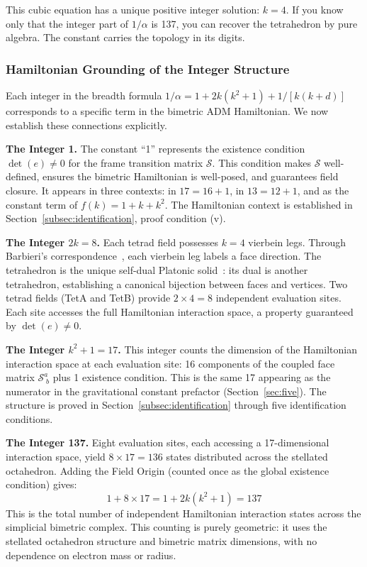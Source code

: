 \documentclass[aps,prd,preprint,superscriptaddress,showpacs,preprintnumbers,amsmath,amssymb,nofootinbib]{revtex4-2}
\begin{document}
This cubic equation has a unique positive integer solution: $k = 4$. If you know only that the integer part of $1/\alpha$ is 137, you can recover the tetrahedron by pure algebra. The constant carries the topology in its digits.

\subsubsection*{Hamiltonian Grounding of the Integer Structure}

Each integer in the breadth formula $1/\alpha = 1 + 2k(k^2 + 1) + 1/[k(k+d)]$ corresponds to a specific term in the bimetric ADM Hamiltonian. We now establish these connections explicitly.

\textbf{The Integer 1.}
The constant ``1'' represents the existence condition $\det(e) \neq 0$ for the frame transition matrix $\mathcal{S}$. This condition makes $\mathcal{S}$ well-defined, ensures the bimetric Hamiltonian is well-posed, and guarantees field closure. It appears in three contexts: in $17 = 16 + 1$, in $13 = 12 + 1$, and as the constant term of $f(k) = 1 + k + k^2$. The Hamiltonian context is established in Section~\ref{subsec:identification}, proof condition (v).

\textbf{The Integer $2k = 8$.}
Each tetrad field possesses $k = 4$ vierbein legs. Through Barbieri's correspondence~\cite{barbieri1998}, each vierbein leg labels a face direction. The tetrahedron is the unique self-dual Platonic solid~\cite{coxeter1973}: its dual is another tetrahedron, establishing a canonical bijection between faces and vertices. Two tetrad fields (TetA and TetB) provide $2 \times 4 = 8$ independent evaluation sites. Each site accesses the full Hamiltonian interaction space, a property guaranteed by $\det(e) \neq 0$.

\textbf{The Integer $k^2 + 1 = 17$.}
This integer counts the dimension of the Hamiltonian interaction space at each evaluation site: 16 components of the coupled face matrix $\mathcal{S}^a_{\;b}$ plus 1 existence condition. This is the same 17 appearing as the numerator in the gravitational constant prefactor (Section~\ref{sec:five}). The structure is proved in Section~\ref{subsec:identification} through five identification conditions.

\textbf{The Integer 137.}
Eight evaluation sites, each accessing a 17-dimensional interaction space, yield $8 \times 17 = 136$ states distributed across the stellated octahedron. Adding the Field Origin (counted once as the global existence condition) gives:
\begin{equation}
1 + 8 \times 17 = 1 + 2k(k^2 + 1) = 137
\end{equation}
This is the total number of independent Hamiltonian interaction states across the simplicial bimetric complex. This counting is purely geometric: it uses the stellated octahedron structure and bimetric matrix dimensions, with no dependence on electron mass or radius.
\end{document}

